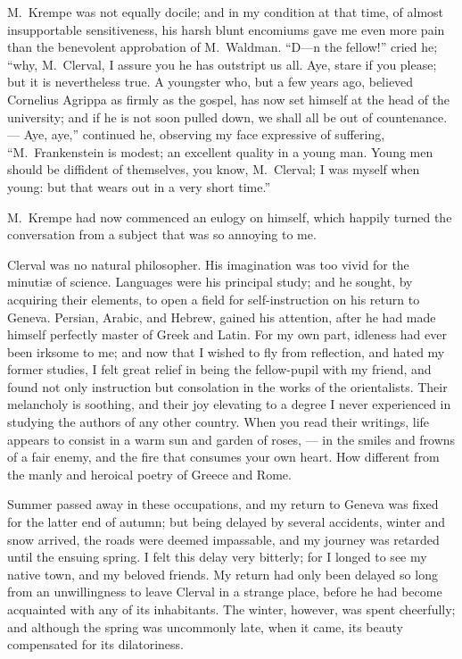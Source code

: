 M.~Krempe was not equally docile;
and in my condition at that time, of
almost insupportable sensitiveness, his
harsh blunt encomiums gave me even
more pain than the benevolent approbation
of M.~Waldman. ``D---n the
fellow!'' cried he; ``why, M.~Clerval,
I assure you he has outstript us all.
Aye, stare if you please; but it is nevertheless
true. A youngster who, but
a few years ago, believed Cornelius
Agrippa as firmly as the gospel, has
now set himself at the head of the university;
and if he is not soon pulled
down, we shall all be out of countenance. --- Aye,
aye,'' continued he, observing
my face expressive of suffering,
``M.~Frankenstein is modest; an excellent
quality in a young man. Young
men should be diffident of themselves,
you know, M.~Clerval; I was myself
when young: but that wears out in a
very short time.''

M.~Krempe had now commenced an
eulogy on himself, which happily turned
the conversation from a subject that
was so annoying to me.

Clerval was no natural philosopher.
His imagination was too vivid for the
minutiæ of science. Languages were his
principal study; and he sought, by acquiring
their elements, to open a field for
self-instruction on his return to Geneva.
Persian, Arabic, and Hebrew, gained
his attention, after he had made himself
perfectly master of Greek and Latin. For
my own part, idleness had ever been
irksome to me; and now that I wished
to fly from reflection, and hated my former
studies, I felt great relief in being
the fellow-pupil with my friend, and
found not only instruction but consolation
in the works of the orientalists.
Their melancholy is soothing, and their
joy elevating to a degree I never experienced
in studying the authors of any
other country. When you read their
writings, life appears to consist in a
warm sun and garden of roses, --- in the
smiles and frowns of a fair enemy, and
the fire that consumes your own heart.
How different from the manly and heroical
poetry of Greece and Rome.

Summer passed away in these occupations,
and my return to Geneva
was fixed for the latter end of autumn;
but being delayed by several accidents,
winter and snow arrived, the roads were
deemed impassable, and my journey
was retarded until the ensuing spring.
I felt this delay very bitterly; for I
longed to see my native town, and my
beloved friends. My return had only
been delayed so long from an unwillingness
to leave Clerval in a strange
place, before he had become acquainted
with any of its inhabitants. The winter,
however, was spent cheerfully; and
although the spring was uncommonly
late, when it came, its beauty compensated
for its dilatoriness.

